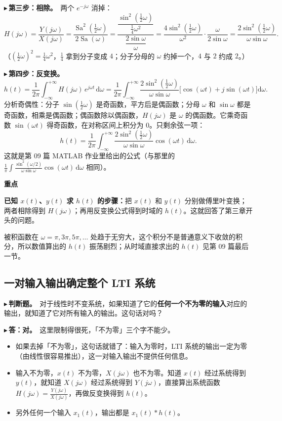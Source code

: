 \documentclass[UTF8,a4paper,11pt]{ctexart}
\newcommand{\Sa}{\operatorname{Sa}}
\newcommand{\dd}{\mathrm{d}}
\newenvironment{remember}{\begin{rememberbox}\textbf{重点}\par\smallskip}{\end{rememberbox}}
\newcounter{ex}[section]
\newcommand{\point}[1]{\par\addvspace{1ex}\noindent\textcolor{ptteal}{$\blacktriangleright$\,\textbf{#1}}\ }
\begin{document}
\point{第三步：相除。}两个 $e^{-j\omega}$ 消掉：
\[
H(j\omega)=\frac{Y(j\omega)}{X(j\omega)}=\frac{\Sa^2(\frac12\omega)}{2\Sa(\omega)}
=\frac{\dfrac{\sin^2(\frac12\omega)}{\frac14\omega^2}}{\dfrac{2\sin\omega}{\omega}}
=\frac{4\sin^2(\frac12\omega)}{\omega^2}\cdot\frac{\omega}{2\sin\omega}
=\frac{2\sin^2(\frac12\omega)}{\omega\sin\omega}.
\]
（$(\frac12\omega)^2=\frac14\omega^2$，$\frac14$ 拿到分子变成 $4$；分子分母的 $\omega$ 约掉一个，$4$ 与 $2$ 约成 $2$。）

\point{第四步：反变换。}
\[
h(t)=\frac1{2\pi}\int_{-\infty}^{+\infty}H(j\omega)\,e^{j\omega t}\,\dd\omega
=\frac1{2\pi}\int_{-\infty}^{+\infty}\frac{2\sin^2(\frac12\omega)}{\omega\sin\omega}\big[\cos(\omega t)+j\sin(\omega t)\big]\dd\omega .
\]
分析奇偶性：分子 $\sin(\frac12\omega)$ 是奇函数，平方后是偶函数；分母 $\omega$ 和 $\sin\omega$ 都是奇函数，相乘是偶函数；偶函数除以偶函数，$H(j\omega)$ 是 $\omega$ 的偶函数。它乘奇函数 $\sin(\omega t)$ 得奇函数，在对称区间上积分为 $0$。只剩余弦一项：
\[
h(t)=\frac1{2\pi}\int_{-\infty}^{+\infty}\frac{2\sin^2(\frac12\omega)}{\omega\sin\omega}\cos(\omega t)\,\dd\omega .
\]
这就是第 09 篇 MATLAB 作业里给出的公式（与那里的 $\frac1\pi\int\frac{\sin^2(\omega/2)}{\omega\sin\omega}\cos(\omega t)\,\dd\omega$ 相同）。

\begin{remember}
\textbf{已知 $x(t)$、$y(t)$ 求 $h(t)$ 的步骤：}把 $x(t)$ 和 $y(t)$ 分别做傅里叶变换；两者相除得到 $H(j\omega)$；再用反变换公式得到时域的 $h(t)$。这就回答了第三章开头的问题。
\end{remember}
被积函数在 $\omega=\pi,3\pi,5\pi,\dots$ 处趋于无穷大，这个积分不是普通意义下收敛的积分，所以数值算出的 $h(t)$ 振荡剧烈；从时域直接求出的 $h(t)$ 见第 09 篇最后一节。

\subsection{一对输入输出确定整个 LTI 系统}\label{sub:onepair}
\point{判断题。}对于线性时不变系统，如果知道了它的\textbf{任何一个不为零的输入}对应的输出，就知道了它对所有输入的输出。这句话对吗？

\point{答：对。}这里限制得很死，「不为零」三个字不能少。

\begin{itemize}[nosep]
\item 如果去掉「不为零」，这句话就错了：输入为零时，LTI 系统的输出一定为零（由线性很容易推出），这一对输入输出不提供任何信息。
\item 输入不为零，$x(t)$ 不为零，$X(j\omega)$ 也不为零。知道 $x(t)$ 经过系统得到 $y(t)$，就知道 $X(j\omega)$ 经过系统得到 $Y(j\omega)$，直接算出系统函数 $H(j\omega)=\frac{Y(j\omega)}{X(j\omega)}$，再做反变换得到 $h(t)$。
\item 另外任何一个输入 $x_1(t)$，输出都是 $x_1(t)*h(t)$。
\end{itemize}
\end{document}
